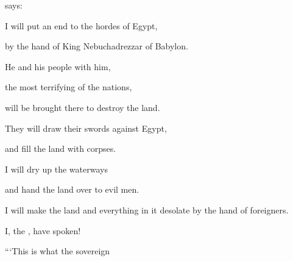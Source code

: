 {{}
says:
\par }{\Q I will put an end
to the hordes
of Egypt,
\par }{\Q by the hand
of King
Nebuchadrezzar
of Babylon.
\par }{\Q {}He
and his people
with
him,
\par }{\Q the most terrifying
of the nations,
\par }{\Q will be brought
there to destroy
the land.
\par }{\Q They will draw
their swords
against
Egypt,
\par }{\Q and fill
the
land
with corpses.
\par }{\Q {}I will
dry up
the waterways
\par }{\Q and hand
the land
over to
evil men.
\par }{\Q I will make
the land
and everything
in it desolate
by the hand
of foreigners.
\par }{\Q I,
the {}, have spoken!
\par }{\Q {}“‘This is what
the sovereign

}
